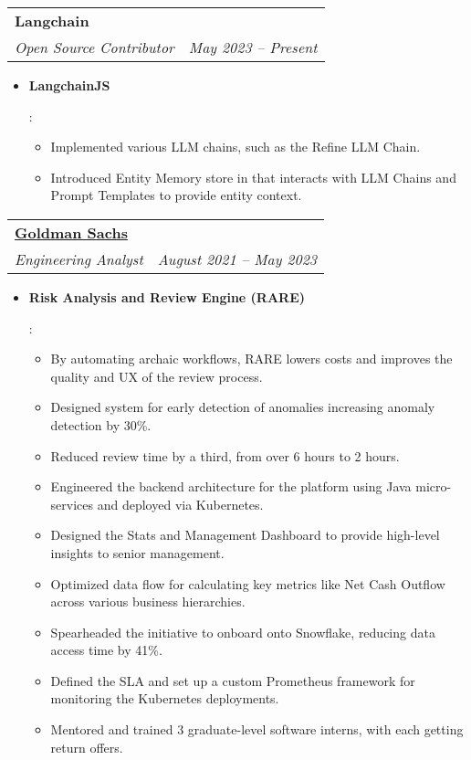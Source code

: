 \documentclass[letterpaper,11pt]{article}
\makeatletter
\newcommand{\resumeItem}[2]{
  \item\small{
    \textbf{#1}{: #2 \vspace{-2pt}}
  }
}
\newcommand{\resumeSubheading}[4]{
  \vspace{-1pt}\item
    \begin{tabular*}{0.97\textwidth}[t]{l@{\extracolsep{\fill}}r}
      \textbf{#1} & #2 \\
      \textit{\small#3} & \textit{\small #4} \\
    \end{tabular*}\vspace{-5pt}
}
\newcommand{\resumeSubSubHeading}[2]{\textit{\small #1} \hfill \textit{\small #2} }
\newcommand{\resumeItemListStart}{\begin{itemize}}
\newcommand{\resumeItemListEnd}{\end{itemize}\vspace{-5pt}}
\makeatother
\begin{document}
    \resumeSubheading
  {Langchain}{}
  {Open Source Contributor}{May 2023 -- Present}
    \resumeItemListStart
      \resumeItem{LangchainJS}
      {
        \begin{itemize}
          \item Implemented various LLM chains, such as the Refine LLM Chain. 
          \item Introduced Entity Memory store in that interacts with LLM Chains and Prompt Templates to provide entity context. 
        \end{itemize}
      }  
    \resumeItemListEnd

    \resumeSubheading
    {\href{https://www.goldmansachs.com/}{Goldman Sachs}}{}
    {Engineering Analyst}{August 2021 -- May 2023}
    \resumeItemListStart
    \resumeItem{Risk Analysis and Review Engine (RARE)}
        {
        \begin{itemize}
        \item By automating archaic workflows, RARE lowers costs and improves the quality and UX of the review process.
        \item Designed system for early detection of anomalies increasing anomaly detection by 30\%.
        \item Reduced review time by a third, from over 6 hours to 2 hours.
        \item Engineered the backend architecture for the platform using  Java micro-services and deployed via Kubernetes.
        \item Designed the Stats and Management Dashboard to provide high-level insights to senior management.
        \item Optimized data flow for calculating key metrics like Net Cash Outflow across various business hierarchies.
        \item Spearheaded the initiative to onboard onto Snowflake, reducing data access time by 41\%. 
        \item Defined the SLA and set up a custom Prometheus framework for monitoring the Kubernetes deployments.
        \item Mentored and trained 3 graduate-level software interns, with each getting return offers. 
        \end{itemize}
        }
    \resumeItemListEnd
    \iffalse
    \resumeSubSubHeading {Summer Analyst}{May 2020 -- June 2020}
    \resumeItemListStart
    \resumeItem{Risk Metrics Inventory UI}
        {
          \begin{itemize}
          \item Developed a React UI that acts as a central registry and lets users perform CRUD operations on metrics meta-data, keeping inter-dependencies consistent.
          \item Reduced onboarding time from over 5 minutes to under a minute.
          \end{itemize}
        }
    \resumeItemListEnd
    \fi
\end{document}
